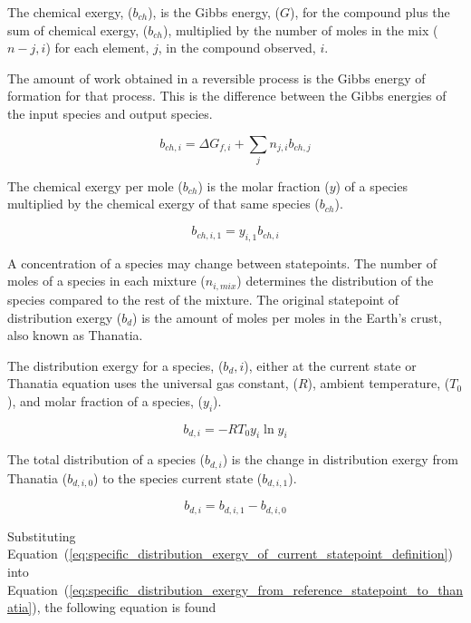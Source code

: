 \documentclass[energies,article,submit,pdftex,moreauthors]{Definitions/mdpi}
\begin{document}
The chemical exergy, ($b_{ch}$), is the Gibbs energy, ($G$), for the compound
plus the sum of chemical exergy, ($b_{ch}$),
multiplied by the number of moles
in the mix ($n-{j,i}$) for each element, $j$,
in the compound observed, $i$.

The amount of work obtained
in a reversible process is the Gibbs energy
of formation for that process.
This is the difference between the Gibbs energies
of the input species and output species.

\begin{equation}\label{eq:specific_chemical_exergy_definition}
  b_{ch,i} = \Delta{G_{f,i}} + \sum_{j}{n_{j,i}b_{ch,j}}
\end{equation}

The chemical exergy per mole ($b_{ch}$) is the molar fraction ($y$)
of a species multiplied by the chemical exergy of that same species ($b_{ch}$).

\begin{equation}\label{eq:chemical_exergy_state_point1}
  b_{ch,i,1} = y_{i,1}b_{ch,i}
\end{equation}

A concentration of a species
may change between statepoints.
The number of moles of a species in each mixture ($n_{i,mix}$)
determines the distribution of the species
compared to the rest of the mixture.
The original statepoint of distribution exergy ($b_d$) is the amount of moles per moles
in the Earth's crust, also known as Thanatia.

The distribution exergy for a species, ($b_d,i$),
either at the current state or Thanatia
equation uses the universal gas constant, ($R$),
ambient temperature, ($T_0$),
and molar fraction of a species, ($y_i$).

\begin{equation}\label{eq:specific_distribution_exergy_of_current_statepoint_definition}
  b_{d,i} = -RT_{0}y_{i}\ln{y_{i}}
\end{equation}

The total distribution of a species ($b_{d,i}$) is the change in distribution exergy from Thanatia ($b_{d,i,0}$)
to the species current state ($b_{d,i,1}$).

\begin{equation}\label{eq:specific_distribution_exergy_from_reference_statepoint_to_thanatia}
  b_{d,i} = b_{d,i,1} - b_{d,i,0}
\end{equation}

Substituting Equation~(\ref{eq:specific_distribution_exergy_of_current_statepoint_definition}) into Equation~(\ref{eq:specific_distribution_exergy_from_reference_statepoint_to_thanatia}),
the following equation is found
\end{document}
